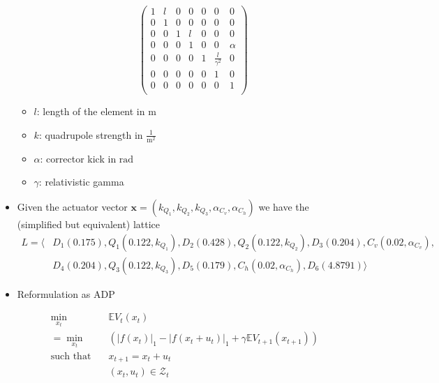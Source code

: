 \begin{itemize}
\begin{itemize}
\begin{equation*}
\begin{pmatrix}
                                                                     1 & l & 0 & 0 & 0 & 0 & 0 \\ %
                                                                     0 & 1 & 0 & 0 & 0 & 0 & 0 \\ %
                                                                     0 & 0 & 1 & l & 0 & 0 & 0 \\ %
                                                                     0 & 0 & 0 & 1 & 0 & 0 & \alpha \\ %
                                                                     0 & 0 & 0 & 0 & 1 & \frac{l}{\gamma^2} & 0 \\ %
                                                                     0 & 0 & 0 & 0 & 0 & 1 & 0 \\ %
                                                                     0 & 0 & 0 & 0 & 0 & 0 & 1 \\
                                                                 \end{pmatrix}
            \end{equation*}
    \end{itemize}
    \begin{itemize}
        \item $l$: length of the element in $\text{m}$
        \item $k$: quadrupole strength in $\frac{1}{\text{m}^2}$
        \item $\alpha$: corrector kick in $\text{rad}$
        \item $\gamma$: relativistic gamma  
    \end{itemize}
    
    \item Given the actuator vector $\bm{x} = (k_{Q_1}, k_{Q_2}, k_{Q_3}, \alpha_{C_v}, \alpha_{C_h})$ we have the (simplified but equivalent) lattice
    \begin{equation*}
    \begin{aligned}
        L = \langle & D_1(0.175), Q_1(0.122,k_{Q_1}), D_2(0.428), Q_2(0.122,k_{Q_2}), D_3(0.204), C_v(0.02,\alpha_{C_v}), \\ & D_4(0.204), Q_3(0.122,k_{Q_3}), D_5(0.179), C_h(0.02,\alpha_{C_h}), D_6(4.8791) \rangle
    \end{aligned}
    \end{equation*}
    
    
    \item Reformulation as ADP
    
    \begin{align*}
        \min_{x_t} \quad&\mathbb{E} V_t(x_t)\\ = \min_{x_t} \quad& \left(|f(x_t)|_1-|f(x_t+u_t)|_1 +\gamma \mathbb{E} V_{t+1}(x_{t+1}) \right)\\
        \text{such that} \quad &x_{t+1}=x_t+u_t\\
        & (x_t,u_t)\in\mathcal{Z}_t 
    \end{align*}
\end{itemize}

